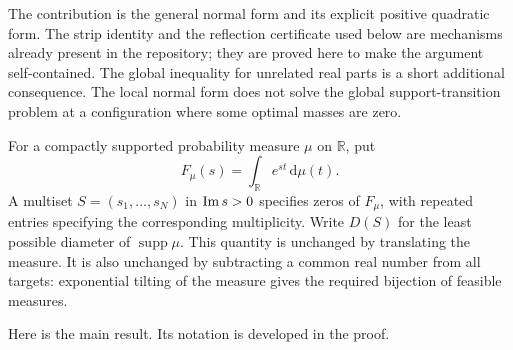 \documentclass[11pt]{article}
\theoremstyle{remark}\newtheorem{remark}[theorem]{Remark}
\newcommand{\R}{\mathbb R}\newcommand{\C}{\mathbb C}
\newcommand{\dd}{\,\mathrm d}\newcommand{\supp}{\operatorname{supp}}
\begin{document}
The contribution is the general normal form and its explicit positive
quadratic form. The strip identity and the reflection certificate used below
are mechanisms already present in the repository; they are proved here to
make the argument self-contained. The global inequality for unrelated real
parts is a short additional consequence. The local normal form does not
solve the global support-transition problem at a configuration where some
optimal masses are zero.

For a compactly supported probability measure $\mu$ on $\R$, put
\[
 F_\mu(s)=\int_\R e^{st}\dd\mu(t).
\]
A multiset $S=(s_1,\ldots,s_N)$ in $\operatorname{Im} s>0$ specifies zeros of $F_\mu$,
with repeated entries specifying the corresponding multiplicity. Write
$D(S)$ for the least possible diameter of $\supp\mu$. This quantity is
unchanged by translating the measure. It is also unchanged by subtracting
a common real number from all targets: exponential tilting of the measure
gives the required bijection of feasible measures.

Here is the main result. Its notation is developed in the proof.
\end{document}
